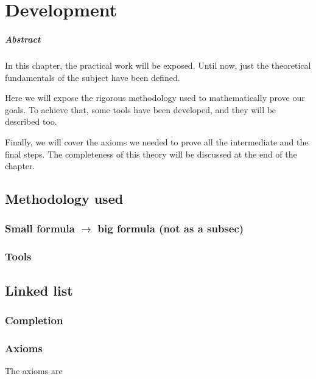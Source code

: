 \chapter{Development\label{sec:develpment}}

\paragraph{Abstract} In this chapter, the practical work will be exposed. Until now, just the theoretical fundamentals of the subject have been defined.

Here we will expose the rigorous methodology used to mathematically prove our goals. To achieve that, some tools have been developed, and they will be described too.

Finally, we will cover the axioms we needed to prove all the intermediate and the final steps. The completeness of this theory will be discussed at the end of the chapter. 

\section{Methodology used}

\subsection{Small formula $\rightarrow$ big formula (not as a subsec)}

\subsection{Tools}

\section{Linked list}

\subsection{Completion}
\subsection{Axioms}


The axioms are

\begin{description}

\end{description}

